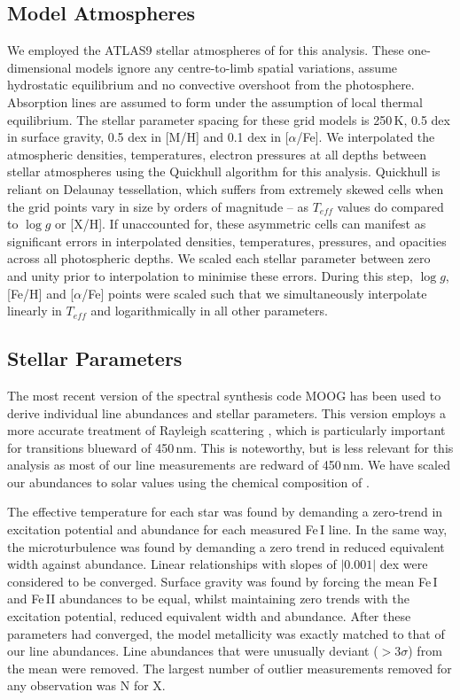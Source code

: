 \documentclass{emulateapj}
\begin{document}

\subsection{Model Atmospheres}
We employed the ATLAS9 stellar atmospheres of \citet{Castelli;Kurucz_2003} for this analysis. These one-dimensional models ignore any centre-to-limb spatial variations, assume hydrostatic equilibrium and no convective overshoot from the photosphere. Absorption lines are assumed to form under the assumption of local thermal equilibrium. The stellar parameter spacing for these grid models is 250\,K, 0.5 dex in surface gravity, 0.5 dex in [M/H] and 0.1 dex in [$\alpha$/Fe]. We interpolated the atmospheric densities, temperatures, electron pressures at all depths between stellar atmospheres using the Quickhull algorithm for this analysis. Quickhull is reliant on Delaunay tessellation, which suffers from extremely skewed cells when the grid points vary in size by orders of magnitude -- as $T_{eff}$ values do compared to $\log{g}$ or [X/H]. If unaccounted for, these asymmetric cells can manifest as significant errors in interpolated densities, temperatures, pressures, and opacities across all photospheric depths. We scaled each stellar parameter between zero and unity prior to interpolation to minimise these errors. During this step, $\log{g}$, [Fe/H] and [$\alpha$/Fe] points were scaled such that we simultaneously interpolate linearly in $T_{eff}$ and logarithmically in all other parameters.

\subsection{Stellar Parameters}
The most recent version of the spectral synthesis code MOOG \citep{Sneden;et-al_1973} has been used to derive individual line abundances and stellar parameters. This version employs a more accurate treatment of Rayleigh scattering \citep{Sobeck;et-al_2011}, which is particularly important for transitions blueward of 450\,nm. This is noteworthy, but is less relevant for this analysis as most of our line measurements are redward of 450\,nm. We have scaled our abundances to solar values using the chemical composition of \citet{Asplund;et-al_2009}.

The effective temperature for each star was found by demanding a zero-trend in excitation potential and abundance for each measured Fe\,I line. In the same way, the microturbulence was found by demanding a zero trend in reduced equivalent width against abundance. Linear relationships with slopes of $|0.001|$ dex were considered to be converged. Surface gravity was found by forcing the mean Fe\,I and Fe\,II abundances to be equal, whilst maintaining zero trends with the excitation potential, reduced equivalent width and abundance. After these parameters had converged, the model metallicity was exactly matched to that of our line abundances. Line abundances that were unusually deviant ($>3\sigma$) from the mean were removed. The largest number of outlier measurements removed for any observation was N for X.
\end{document}

